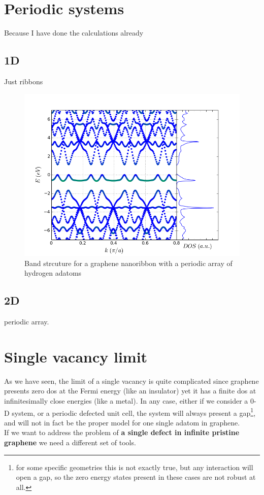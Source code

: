 \section{Periodic systems}
Because I have done the calculations already
\subsection{1D}
Just ribbons
\begin{figure}[h!]
  \centering
  \includegraphics{chapter05/figures/2dbands.png}
  \vspace{-5pt}
  \caption{Band strcuture for a graphene nanoribbon with a periodic array of hydrogen adatoms}
\end{figure}
\FloatBarrier
\subsection{2D}
periodic array.




\section{Single vacancy limit}
As we have seen, the limit of a single vacancy is quite complicated since graphene presents zero \ac{dos} at the Fermi energy (like an insulator) yet it has a finite \ac{dos} at infinitesimally close energies (like a metal). In any case, either if we consider a 0-D system, or a periodic defected unit cell, the system will always present a gap\footnote{for some specific geometries this is not exactly true, but any interaction will open a gap, so the zero energy states present in these cases are not robust at all.}, and will not in fact be the proper model for one single adatom in graphene.\\
If we want to address the problem of \textbf{a single defect in infinite pristine graphene} we need a different set of tools.

